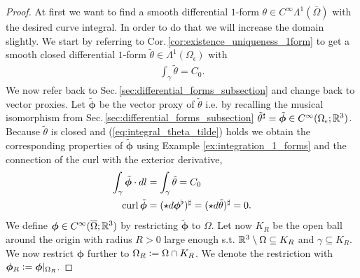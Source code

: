 \documentclass[../main.tex]{subfiles}
\begin{document}
\begin{proof}
    At first we want to find a smooth differential $1$-form 
    $\theta \in C^\infty\Lambda^1(\overline{\Omega})$ with the desired curve integral. 
    In order to do that we will increase the 
    domain slightly.
    We start by referring to Cor.\,\ref{cor:existence_uniqueness_1form} 
    to get a smooth closed differential $1$-form 
    $\tilde{\theta} \in \Lambda^1(\Omega_\epsilon)$ with 
    \begin{align}
        \int_\gamma \tilde{\theta} = C_0. \label{eq:integral_theta_tilde}
    \end{align}
    We now refer back to Sec.\,\ref{sec:differential_forms_subsection} 
    and change back to vector proxies. Let 
    $\tilde{\bm{\phi}}$ be the vector proxy of $\tilde{\theta}$ 
    i.e. by recalling the musical isomorphism from Sec.\,\ref{sec:differential_forms_subsection}
     $\tilde{\theta}^\sharp = \tilde{\bm{\phi}} \in C^\infty(\Omega_\epsilon;\mathbb{R}^3)$.
    Because $\tilde{\theta}$ is closed and (\ref{eq:integral_theta_tilde}) holds
    we obtain the corresponding properties 
    of $\tilde{\bm{\phi}}$ using Example \ref{ex:integration_1_forms} and the connection 
    of the curl with the exterior derivative,
    \begin{align*}
        \int_\gamma \tilde{\bm{\phi}} \cdot dl &= \int_\gamma \tilde{\theta} = C_0 
        \\ \operatorname{curl} \tilde{\bm{\phi}} &= (\star d\boldsymbol{\bm{\phi}}^\flat)^\sharp = 
        (\star d\tilde{\theta})^\sharp = 0.
    \end{align*}
    We define $\bm{\phi} \in C^\infty(\overline{\Omega};\mathbb{R}^3)$ by restricting $\tilde{\bm{\phi}}$ to $\Omega$. 
    Let now $K_R$ be the open ball around the origin with radius $R>0$ large
    enough s.t. $\mathbb{R}^3 \setminus \Omega \subseteq K_R$ and $\gamma \subseteq K_R$. 
    We now restrict $\bm{\phi}$ further to
    $\Omega_R \vcentcolon= \Omega \cap K_R$. We denote the restriction with 
    $\bm{\phi}_R \vcentcolon= \bm{\phi}|_{\Omega_R}$. 


\end{proof}
\end{document}
